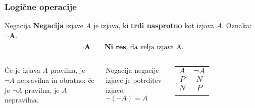         \begin{frame}
            \frametitle{Logične operacije}

            \begin{alertblock}{Negacija}
                \textbf{Negacija} izjave $A$ je izjava, ki \textbf{trdi nasprotno} 
                kot izjava $A$.
                Oznaka: $\mathbf{\lnot A}$.
                $$ \mathbf{\lnot A} \quad \quad \textmd{\textbf{Ni res}, da velja izjava A.}$$
            \end{alertblock}

            \begin{columns}
                    \begin{alertblock}{}
                        Če je izjava $A$ pravilna, je $\lnot A$ nepravilna in obratno: 
                        če je $\lnot A$ pravilna, je $A$ nepravilna.
                    \end{alertblock}
                    \begin{alertblock}{}
                        Negacija negacije izjave je potrditev izjave. \quad $\lnot(\lnot A)=A$
                    \end{alertblock}

                \begin{table}
                    \centering
                    \begin{tabular}{||c|c||} 
                    \hhline{|t:==:t|}
                    \rowcolor[rgb]{0.843,0.718,0.718} $A$ & $\lnot A$  \\ 
                    \hhline{|:==:|}
                    $P$                                   & $N$                       \\ 
                    \hline
                    $N$                                   & $P$                       \\
                    \hhline{|b:==:b|}
                    \end{tabular}                    
                \end{table}                

            \end{columns}
        \end{frame}

